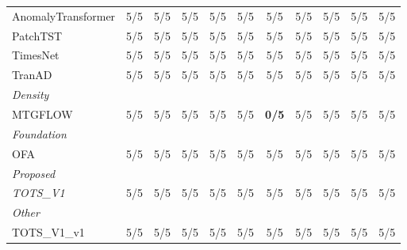 \begin{table}[t]
\begin{tabular}{lcccccccccc}
AnomalyTransformer & 5/5 & 5/5 & 5/5 & 5/5 & 5/5 & 5/5 & 5/5 & 5/5 & 5/5 & 5/5 \\
PatchTST & 5/5 & 5/5 & 5/5 & 5/5 & 5/5 & 5/5 & 5/5 & 5/5 & 5/5 & 5/5 \\
TimesNet & 5/5 & 5/5 & 5/5 & 5/5 & 5/5 & 5/5 & 5/5 & 5/5 & 5/5 & 5/5 \\
TranAD & 5/5 & 5/5 & 5/5 & 5/5 & 5/5 & 5/5 & 5/5 & 5/5 & 5/5 & 5/5 \\
\midrule
\multicolumn{11}{l}{\textit{Density}} \\
MTGFLOW & 5/5 & 5/5 & 5/5 & 5/5 & 5/5 & \textbf{0/5} & 5/5 & 5/5 & 5/5 & 5/5 \\
\midrule
\multicolumn{11}{l}{\textit{Foundation}} \\
OFA & 5/5 & 5/5 & 5/5 & 5/5 & 5/5 & 5/5 & 5/5 & 5/5 & 5/5 & 5/5 \\
\midrule
\multicolumn{11}{l}{\textit{Proposed}} \\
\textit{TOTS\_V1} & 5/5 & 5/5 & 5/5 & 5/5 & 5/5 & 5/5 & 5/5 & 5/5 & 5/5 & 5/5 \\
\midrule
\multicolumn{11}{l}{\textit{Other}} \\
TOTS\_V1\_v1 & 5/5 & 5/5 & 5/5 & 5/5 & 5/5 & 5/5 & 5/5 & 5/5 & 5/5 & 5/5 \\
\bottomrule
\end{tabular}
\end{table}
